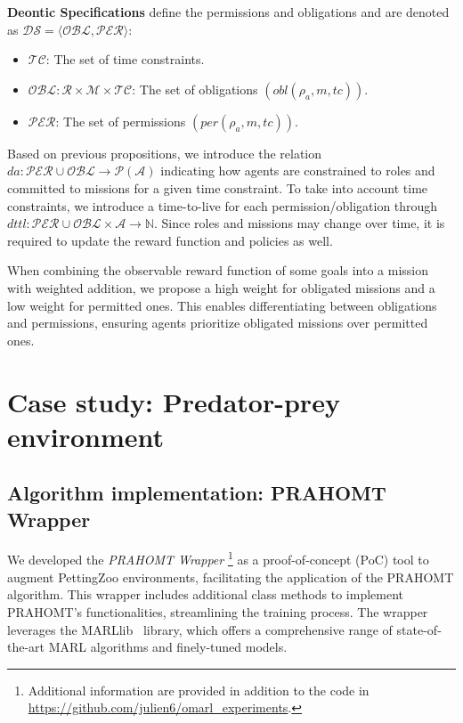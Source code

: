 \documentclass[runningheads]{llncs}
\theoremstyle{freethm}
\theoremstyle{proofoutline}
\newcounter{relation}
\newcounter{proof}
\begin{document}
\textbf{Deontic Specifications} define the permissions and obligations and are denoted as $\mathcal{DS} = \langle \mathcal{OBL}, \mathcal{PER} \rangle$:

\begin{itemize}
    \item $\mathcal{TC}$: The set of time constraints.
    \item $\mathcal{OBL}: \mathcal{R} \times \mathcal{M} \times \mathcal{TC}$: The set of obligations $(obl(\rho_a, m, tc))$.
    \item $\mathcal{PER}$: The set of permissions $(per(\rho_a, m, tc))$.
\end{itemize}

Based on previous propositions, we introduce the relation $da: \mathcal{PER} \cup \mathcal{OBL} \rightarrow \mathcal{P}(\mathcal{A})$ indicating how agents are constrained to roles and committed to missions for a given time constraint. To take into account time constraints, we introduce a time-to-live for each permission/obligation through $dttl: \mathcal{PER} \cup \mathcal{OBL} \times \mathcal{A} \rightarrow \mathbb{N}$. Since roles and missions may change over time, it is required to update the reward function and policies as well.

When combining the observable reward function of some goals into a mission with weighted addition, we propose a high weight for obligated missions and a low weight for permitted ones. This enables differentiating between obligations and permissions, ensuring agents prioritize obligated missions over permitted ones.



\section{Case study: Predator-prey environment}

\subsection{Algorithm implementation: PRAHOMT Wrapper}

We developed the \textit{PRAHOMT Wrapper}
%
\footnote{Additional information are provided in addition to the code in \url{https://github.com/julien6/omarl_experiments}.}
%
as a proof-of-concept (PoC) tool to augment PettingZoo environments, facilitating the application of the PRAHOMT algorithm. This wrapper includes additional class methods to implement PRAHOMT's functionalities, streamlining the training process. The wrapper leverages the MARLlib~\cite{hu2022marllib} library, which offers a comprehensive range of state-of-the-art MARL algorithms and finely-tuned models.
\end{document}
